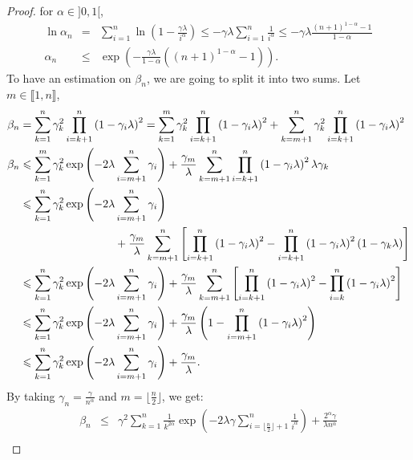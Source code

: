 \begin{proof}
\item for $\alpha \in ]0,1[$, 
\begin{eqnarray*}
\ln \alpha_n &=& \sum_{i=1}^n \ln \left( 1 - \frac{\gamma \lambda}{i^\alpha}\right) \leqslant -\gamma \lambda \sum_{i=1}^n \frac{1}{i^\alpha} \leqslant -\gamma\lambda \frac{(n+1)^{1-\alpha}-1}{1-\alpha} \\
\alpha_n &\leqslant& \exp\left( -\frac{\gamma\lambda}{1-\alpha} \left((n+1)^{1-\alpha}-1\right) \right).
\end{eqnarray*}
To have an estimation on $\beta_n$, we are going to split it into two sums. Let $m \in \llbracket 1,n \rrbracket$,
\begin{align*}
\beta_n &= \sum_{k=1}^n \gamma_k^2\prod_{i=k+1}^n \left( 1-\gamma_i\lambda \right)^2 = \sum_{k=1}^{m} \gamma_k^2\prod_{i=k+1}^n \left( 1-\gamma_i\lambda \right)^2 +  \sum_{k=m+1}^n \gamma_k^2\prod_{i=k+1}^n \left( 1-\gamma_i\lambda \right)^2\\
\beta_n &\leqslant \sum_{k=1}^m  \gamma_k^2 \exp\left( -2 \lambda \sum_{i=m+1}^n \gamma_i  \right) +  \frac{\gamma_m}{\lambda}\sum_{k=m+1}^n \prod_{i=k+1}^n \left( 1-\gamma_i\lambda \right)^2 \lambda\gamma_k\\
 &\leqslant \sum_{k=1}^n  \gamma_k^2 \exp\left( -2 \lambda \sum_{i=m+1}^n \gamma_i  \right) \\
 & \hspace{2.98cm}+  \frac{\gamma_m}{\lambda}\sum_{k=m+1}^n \left[ \prod_{i=k+1}^n \left( 1-\gamma_i\lambda \right)^2 - \prod_{i=k+1}^n \left( 1-\gamma_i\lambda \right)^2 (1-\gamma_k\lambda)  \right]\\
 &\leqslant \sum_{k=1}^n  \gamma_k^2 \exp\left( -2 \lambda \sum_{i=m+1}^n \gamma_i  \right) +  \frac{\gamma_m}{\lambda}\sum_{k=m+1}^n \left[ \prod_{i=k+1}^n \left( 1-\gamma_i\lambda \right)^2 - \prod_{i=k}^n \left( 1-\gamma_i\lambda \right)^2 \right]\\
 &\leqslant \sum_{k=1}^n  \gamma_k^2 \exp\left( -2 \lambda \sum_{i=m+1}^n \gamma_i  \right) +  \frac{\gamma_m}{\lambda} \left(1- \prod_{i=m+1}^n \left( 1-\gamma_i\lambda \right)^2\right) \\
 &\leqslant \sum_{k=1}^n  \gamma_k^2 \exp\left( -2 \lambda \sum_{i=m+1}^n \gamma_i  \right) +  \frac{\gamma_m}{\lambda}.
\end{align*}
By taking $\gamma_n = \displaystyle \frac{\gamma}{n^\alpha}$ and $ m = \displaystyle \lfloor\frac{n}{2}\rfloor $, we get: 
\begin{eqnarray*}
\beta_n &\leqslant& \gamma^2\sum_{k=1}^n  \frac{1}{k^{2\alpha}} \exp\left( -2 \lambda\gamma \sum_{i=\lfloor\frac{n}{2}\rfloor+1}^n \frac{1}{i^{\alpha}}  \right) +  \frac{2^\alpha\gamma}{\lambda n^\alpha} \\

\end{eqnarray*}
\end{proof}
